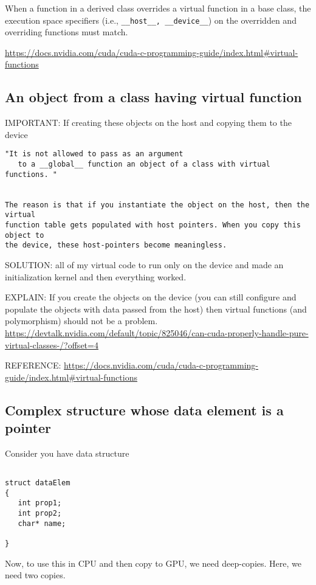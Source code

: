 When a function in a derived class overrides a virtual function in a base class,
the execution space specifiers (i.e., \verb!__host__, __device__!) on the overridden
and overriding functions must match.

\url{https://docs.nvidia.com/cuda/cuda-c-programming-guide/index.html#virtual-functions}


\subsection{An object from a class having virtual function}


IMPORTANT: If creating these objects on the host and copying them to the device
\begin{verbatim}
"It is not allowed to pass as an argument 
   to a __global__ function an object of a class with virtual functions. "


The reason is that if you instantiate the object on the host, then the virtual
function table gets populated with host pointers. When you copy this object to
the device, these host-pointers become meaningless.

\end{verbatim}

SOLUTION: all of my virtual code to run only on the device and made an
initialization kernel and then everything worked.

EXPLAIN: If you create the objects on the device (you can still configure and
populate the objects with data passed from the host) then virtual functions (and
polymorphism) should not be a problem.
\url{https://devtalk.nvidia.com/default/topic/825046/can-cuda-properly-handle-pure-virtual-classes-/?offset=4}

REFERENCE: \url{https://docs.nvidia.com/cuda/cuda-c-programming-guide/index.html#virtual-functions}


\subsection{Complex structure whose data element is a pointer}
\label{sec:complex-datastructure-data-element-is-pointer}


Consider you have data structure
\begin{verbatim}

struct dataElem
{
   int prop1;
   int prop2;
   char* name;

}
\end{verbatim}

Now, to use this in CPU and then copy to GPU, we need deep-copies. Here, we need two copies.

